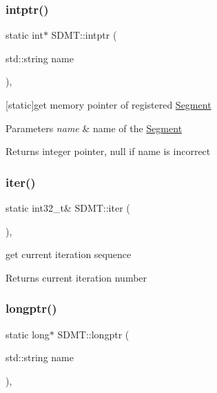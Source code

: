 \subsubsection{\texorpdfstring{intptr()}{intptr()}}
{\footnotesize\ttfamily static int$\ast$ S\+D\+M\+T\+::intptr (\begin{DoxyParamCaption}\item[{std\+::string}]{name }\end{DoxyParamCaption})\hspace{0.3cm}{\ttfamily [inline]}, {\ttfamily [static]}}



\mbox{[}static\mbox{]}get memory pointer of registered \hyperlink{struct_s_d_m_t_1_1_segment}{Segment} 


\begin{DoxyParams}{Parameters}
{\em name} & name of the \hyperlink{struct_s_d_m_t_1_1_segment}{Segment} \\
\hline
\end{DoxyParams}
\begin{DoxyReturn}{Returns}
integer pointer, null if name is incorrect 
\end{DoxyReturn}
\mbox{\label{class_s_d_m_t_a5d4ee5b7434f84e124825576c8128445}} 
\subsubsection{\texorpdfstring{iter()}{iter()}}
{\footnotesize\ttfamily static int32\+\_\+t\& S\+D\+M\+T\+::iter (\begin{DoxyParamCaption}{ }\end{DoxyParamCaption})\hspace{0.3cm}{\ttfamily [inline]}, {\ttfamily [static]}}

get current iteration sequence \begin{DoxyReturn}{Returns}
current iteration number 
\end{DoxyReturn}
\mbox{\label{class_s_d_m_t_ac36749f096dc877e0ff4bbd7370eebe6}} 
\subsubsection{\texorpdfstring{longptr()}{longptr()}}
{\footnotesize\ttfamily static long$\ast$ S\+D\+M\+T\+::longptr (\begin{DoxyParamCaption}\item[{std\+::string}]{name }\end{DoxyParamCaption})\hspace{0.3cm}{\ttfamily [inline]}, {\ttfamily [static]}}



